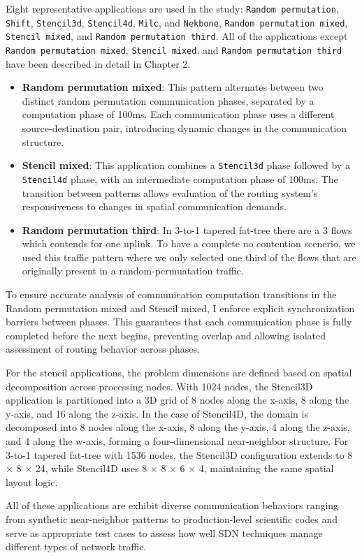 Eight representative applications are used in the study:
\texttt{Random permutation}, \texttt{Shift}, \texttt{Stencil3d}, \texttt{Stencil4d}, \texttt{Milc}, and \texttt{Nekbone}, \texttt{Random permutation mixed}, \texttt{Stencil mixed}, and \texttt{Random permutation third}. All of the applications except \texttt{Random permutation mixed}, \texttt{Stencil mixed}, and \texttt{Random permutation third} have been described
in detail in Chapter 2.

\begin{itemize}
\item \textbf{Random permutation mixed}: This pattern alternates between two distinct random permutation communication phases, separated by a computation phase of 100ms. Each communication phase uses a different source-destination pair, introducing dynamic changes in the communication structure.

\item \textbf{Stencil mixed}: This application combines a \texttt{Stencil3d} phase followed by a \texttt{Stencil4d} phase, with an intermediate computation phase of 100ms. The transition between patterns allows evaluation of the routing system’s responsiveness to changes in spatial communication demands.

\item \textbf{Random permutation third}: In 3-to-1 tapered fat-tree there are a 3 flows which contends for one uplink. To have a complete no contention scenerio, we used this traffic pattern where we only selected one third of the flows that are originally present in a random-permuatation traffic.
\end{itemize}

To ensure accurate analysis of communication computation transitions in the Random permutation mixed and Stencil mixed, I enforce
explicit synchronization barriers between phases. This guarantees
that each communication phase is fully completed before the next begins,
preventing overlap and allowing isolated assessment of routing behavior across phases.

For the stencil applications, the problem dimensions are defined based on spatial decomposition across processing nodes. With 1024 nodes, the Stencil3D application is partitioned into a 3D grid of 8 nodes along the x-axis, 8 along the y-axis, and 16 along the z-axis. In the case of Stencil4D, the domain is decomposed into 8 nodes along the x-axis, 8 along the y-axis, 4 along the z-axis, and 4 along the w-axis, forming a four-dimensional near-neighbor structure. For 3-to-1 tapered fat-tree with 1536 nodes, the Stencil3D configuration extends to 8 × 8 × 24, while Stencil4D uses 8 × 8 × 6 × 4, maintaining the same spatial layout logic.

All of these applications are exhibit diverse communication behaviors ranging from synthetic
near-neighbor patterns to production-level scientific codes
and serve as appropriate test cases to assess how well SDN techniques
manage different types of network traffic.
